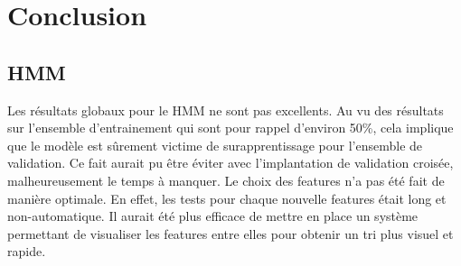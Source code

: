 \chapter{Conclusion}

\section{\ac{HMM}}
Les résultats globaux pour le \ac{HMM} ne sont pas excellents. Au vu des résultats sur l'ensemble d'entrainement qui sont pour rappel d'environ 50\%, cela implique que le modèle est sûrement victime de surapprentissage pour l'ensemble de validation.
Ce fait aurait pu être éviter avec l'implantation de validation croisée, malheureusement le temps à manquer.
Le choix des features n'a pas été fait de manière optimale. En effet, les tests pour chaque nouvelle features était long et non-automatique.
Il aurait été plus efficace de mettre en place un système permettant de visualiser les features entre elles pour obtenir un tri plus visuel et rapide.